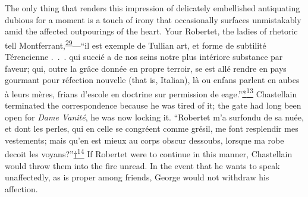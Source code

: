 The only thing that renders this impression of delicately embellished
antiquating dubious for a moment is a touch of irony that occasionally
surfaces unmistakably amid the affected outpourings
\protect\hypertarget{22_Chapter_Fourteen__THE_COMING_OF.xhtmlux5cux23page_392}{}{}of
the heart. Your Robertet, the ladies of rhetoric tell
Montferrant,\textsuperscript{\protect\hypertarget{22_Chapter_Fourteen__THE_COMING_OF.xhtmlux5cux23id_66}{\protect\hyperlink{23_NOTES.xhtmlux5cux23id_67}{29}}}---``il
est exemple de Tullian art, et forme de subtilité Térencienne .~.~. qui
succié a de nos seins notre plus intériore substance par faveur; qui,
outre la grâce donnée en propre terroir, se est allé rendre en pays
gourmant pour réfection nouvelle (that is, Italian), là ou enfans
parlent en aubes à leurs mères, frians d'escole en doctrine sur
permission de
eage.''\protect\hypertarget{22_Chapter_Fourteen__THE_COMING_OF.xhtmlux5cux23id_2787}{\protect\hyperlink{23_NOTES.xhtmlux5cux23id_2788}{*\textsuperscript{13}}}
Chastellain terminated the correspondence because he was tired of it;
the gate had long been open for \emph{Dame Vanité}, he was now locking
it. ``Robertet m'a surfondu de sa nuée, et dont les perles, qui en celle
se congréent comme grésil, me font resplendir mes vestements; mais qu'en
est mieux au corps obscur dessoubs, lorsque ma robe decoit les
voyans?''\protect\hypertarget{22_Chapter_Fourteen__THE_COMING_OF.xhtmlux5cux23id_2785}{\protect\hyperlink{23_NOTES.xhtmlux5cux23id_2786}{†\textsuperscript{14}}}
If Robertet were to continue in this manner, Chastellain would throw
them into the fire unread. In the event that he wants to speak
unaffectedly, as is proper among friends, George would not withdraw his
affection.

